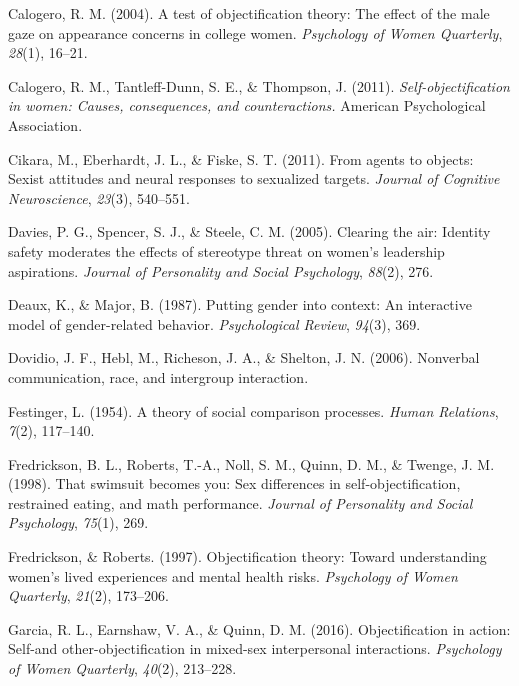 \documentclass[man]{apa6}
\begin{document}
\hypertarget{ref-calogero2004test}{}
Calogero, R. M. (2004). A test of objectification theory: The effect of
the male gaze on appearance concerns in college women. \emph{Psychology
of Women Quarterly}, \emph{28}(1), 16--21.

\hypertarget{ref-calogero2011}{}
Calogero, R. M., Tantleff-Dunn, S. E., \& Thompson, J. (2011).
\emph{Self-objectification in women: Causes, consequences, and
counteractions.} American Psychological Association.

\hypertarget{ref-cikara2011agents}{}
Cikara, M., Eberhardt, J. L., \& Fiske, S. T. (2011). From agents to
objects: Sexist attitudes and neural responses to sexualized targets.
\emph{Journal of Cognitive Neuroscience}, \emph{23}(3), 540--551.

\hypertarget{ref-davies2005clearing}{}
Davies, P. G., Spencer, S. J., \& Steele, C. M. (2005). Clearing the
air: Identity safety moderates the effects of stereotype threat on
women's leadership aspirations. \emph{Journal of Personality and Social
Psychology}, \emph{88}(2), 276.

\hypertarget{ref-deaux1987putting}{}
Deaux, K., \& Major, B. (1987). Putting gender into context: An
interactive model of gender-related behavior. \emph{Psychological
Review}, \emph{94}(3), 369.

\hypertarget{ref-dovidio2006nonverbal}{}
Dovidio, J. F., Hebl, M., Richeson, J. A., \& Shelton, J. N. (2006).
Nonverbal communication, race, and intergroup interaction.

\hypertarget{ref-festinger1954theory}{}
Festinger, L. (1954). A theory of social comparison processes.
\emph{Human Relations}, \emph{7}(2), 117--140.

\hypertarget{ref-fredrickson1998swimsuit}{}
Fredrickson, B. L., Roberts, T.-A., Noll, S. M., Quinn, D. M., \&
Twenge, J. M. (1998). That swimsuit becomes you: Sex differences in
self-objectification, restrained eating, and math performance.
\emph{Journal of Personality and Social Psychology}, \emph{75}(1), 269.

\hypertarget{ref-robertsfredrickson}{}
Fredrickson, \& Roberts. (1997). Objectification theory: Toward
understanding women's lived experiences and mental health risks.
\emph{Psychology of Women Quarterly}, \emph{21}(2), 173--206.

\hypertarget{ref-garcia2016objectification}{}
Garcia, R. L., Earnshaw, V. A., \& Quinn, D. M. (2016). Objectification
in action: Self-and other-objectification in mixed-sex interpersonal
interactions. \emph{Psychology of Women Quarterly}, \emph{40}(2),
213--228.
\end{document}
